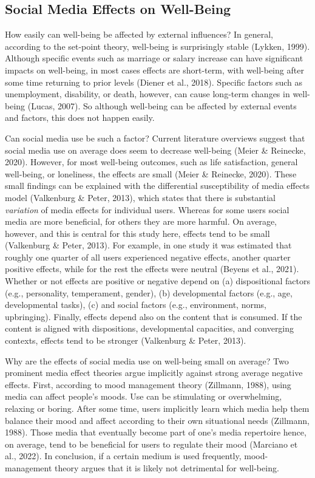 \documentclass[
  man,mask,floatsintext]{apa7}
\begin{document}
\hypertarget{social-media-effects-on-well-being}{%
\subsection{Social Media Effects on Well-Being}\label{social-media-effects-on-well-being}}

How easily can well-being be affected by external influences?
In general, according to the set-point theory, well-being is surprisingly stable (Lykken, 1999).
Although specific events such as marriage or salary increase can have significant impacts on well-being, in most cases effects are short-term, with well-being after some time returning to prior levels (Diener et al., 2018).
Specific factors such as unemployment, disability, or death, however, can cause long-term changes in well-being (Lucas, 2007).
So although well-being can be affected by external events and factors, this does not happen easily.

Can social media use be such a factor?
Current literature overviews suggest that social media use on average does seem to decrease well-being (Meier \& Reinecke, 2020).
However, for most well-being outcomes, such as life satisfaction, general well-being, or loneliness, the effects are small (Meier \& Reinecke, 2020).
These small findings can be explained with the differential susceptibility of media effects model (Valkenburg \& Peter, 2013), which states that there is substantial \emph{variation} of media effects for individual users.
Whereas for some users social media are more beneficial, for others they are more harmful.
On average, however, and this is central for this study here, effects tend to be small (Valkenburg \& Peter, 2013).
For example, in one study it was estimated that roughly one quarter of all users experienced negative effects, another quarter positive effects, while for the rest the effects were neutral (Beyens et al., 2021).
Whether or not effects are positive or negative depend on (a) dispositional factors (e.g., personality, temperament, gender), (b) developmental factors (e.g., age, developmental tasks), (c) and social factors (e.g., environment, norms, upbringing).
Finally, effects depend also on the content that is consumed.
If the content is aligned with dispositions, developmental capacities, and converging contexts, effects tend to be stronger (Valkenburg \& Peter, 2013).

Why are the effects of social media use on well-being small on average?
Two prominent media effect theories argue implicitly against strong average negative effects.
First, according to mood management theory (Zillmann, 1988), using media can affect people's moods.
Use can be stimulating or overwhelming, relaxing or boring.
After some time, users implicitly learn which media help them balance their mood and affect according to their own situational needs (Zillmann, 1988).
Those media that eventually become part of one's media repertoire hence, on average, tend to be beneficial for users to regulate their mood (Marciano et al., 2022).
In conclusion, if a certain medium is used frequently, mood-management theory argues that it is likely not detrimental for well-being.
\end{document}
